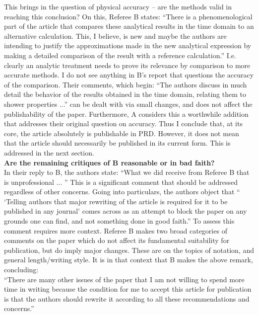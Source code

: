 \documentclass[12pt]{article}
\begin{document}
This brings in the question of physical accuracy – are the methods valid in reaching this conclusion?  On this, Referee B states: ``There is a phenomenological part of the article that compares these analytical results in the time domain to an alternative calculation. This, I believe, is new and maybe the authors are intending to justify the approximations made in the new analytical expression by making a detailed comparison of the result with a reference calculation.'' I.e. clearly an analytic treatment needs to prove its relevance by comparison to more accurate methods.  I do not see anything in B’s report that questions the accuracy of the comparison. Their comments, which begin: ``The authors discuss in much detail the behavior of the results obtained in the time domain, relating them to shower properties ...'' can be dealt with via small changes, and does not affect the publishability of the paper.  Furthermore, A considers this a worthwhile addition that addresses their original question on accuracy. Thus I conclude that, at its core, the article absolutely is publishable in PRD.  However, it does not mean that the article should necessarily be published in its current form. This is addressed in the next section. \\

\textbf{Are the remaining critiques of B reasonable or in bad faith?} \\

In their reply to B, the authors state: ``What we did receive from Referee B that is unprofessional ... '' This is a significant comment that should be addressed regardless of other concerns.  Going into particulars, the authors object that `` `Telling authors that major rewriting of the article is required for it to be published in any journal' comes across as an attempt to block the paper on any grounds one can find, and not something done in good faith.''  To assess this comment requires more context.  Referee B makes two broad categories of comments on the paper which do not affect its fundamental suitability for publication, but do imply major changes. These are on the topics of notation, and general length/writing style. It is in that context that B makes the above remark, concluding: \\

``There are many other issues of the paper that I am not willing to spend more time in writing
because the condition for me to accept this article for publication is that the authors should
rewrite it according to all these recommendations and concerns.'' \\
\end{document}
